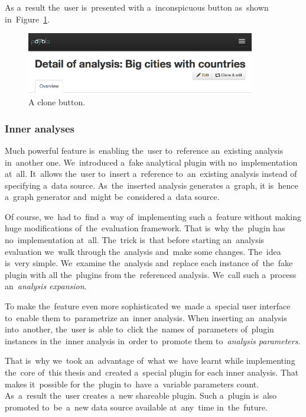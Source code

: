As a~result the~user is~presented with a~inconspicuous button as~shown in~Figure~\ref{fig:clone-button}.

\begin{figure}
	\centering
	\includegraphics[width=100mm]{img/clone-button.png}
	\caption{A clone button.}
	\label{fig:clone-button}
\end{figure}

\subsubsection{Inner analyses}
Much powerful feature is~enabling the~user to~reference an~existing analysis in~another one. We~introduced a~fake analytical plugin with no~implementation at~all. It~allows the~user to~insert a~reference to~an~existing analysis instead 
of specifying a~data source. As~the~inserted analysis generates a~graph, 
it is~hence a~graph generator and~might be~considered a~data source.

Of course, we~had to~find a~way of~implementing such a~feature without 
making huge modifications of~the~evaluation framework. That is~why the~plugin 
has no~implementation at~all. The~trick is~that before starting an~analysis 
evaluation we~walk through the~analysis and~make some changes. The~idea is~very 
simple. We~examine the~analysis and~replace each instance of~the~fake plugin 
with all the~plugins from the~referenced analysis. We~call such a~process an~\emph{analysis expansion}.

To make the~feature even more sophisticated we~made a~special user interface to~enable them to~parametrize an~inner analysis. When inserting an~analysis into~another, the~user is~able to~click the~names of~parameters of~plugin instances 
in the~inner analysis in~order to~promote them to~\emph{analysis parameters}.

That is~why we~took an~advantage of~what we~have learnt while implementing the~core of~this thesis and~created a~special plugin for each inner analysis. That 
makes it~possible for the~plugin to~have a~variable parameters count. As~a~result the~user creates a~new shareable plugin. Such a~plugin is~also promoted to~be~a~new 
data source available at~any~time in~the~future.

